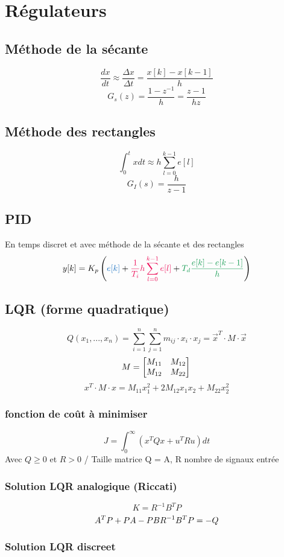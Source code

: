 \documentclass[resume]{subfiles}
\begin{document}
\section{Régulateurs}
\subsection{Méthode de la sécante}
$$\boxed{\frac{dx}{dt}\approx\frac{\Delta x}{\Delta t}=\frac{x[k]-x[k-1]}{h}}$$
$$G_s(z)=\frac{1-z^{-1}}{h}=\frac{z-1}{hz}$$
\subsection{Méthode des rectangles}
$$\boxed{\int_{0}^{t}xdt\approx h\sum_{l=0}^{k-1}e[l]}$$
$$G_{I}(s)=\frac{h}{z-1}$$
\subsection{PID}
En temps discret et avec méthode de la sécante et des rectangles
$$y[k]=K_p\left(\Pcolor{e[k]}+\Icolor{\frac{1}{T_i}h\sum_{l=0}^{k-1}e[l]}+\Dcolor{T_d\frac{e[k]-e[k-1]}{h}}\right)$$

\subsection{LQR (forme quadratique)}
$$Q(x_1,...,x_n) = \sum_{i=1}^{n}\sum_{j=1}^{n}m_{ij}\cdot x_i\cdot x_j = \vec{x}^T\cdot M\cdot \vec{x}$$
$$M = 
\begin{bmatrix}
M_{11} & M_{12}\\
M_{12} & M_{22}
\end{bmatrix}\\$$
$$x^T\cdot M\cdot x = M_{11}x_1^2+2M_{12}x_1x_2+M_{22}x_2^2$$

\subsubsection{fonction de coût à minimiser}
$$J = \int_0^{\infty}(x^TQx + u^TRu)dt$$
Avec $Q\geq0$ et $R > 0$  / Taille matrice Q = A, R nombre de signaux entrée
\subsubsection{Solution LQR analogique (Riccati)}

$$
K = R^{-1}B^TP$$
$$A^TP + PA-PBR^{-1}B^TP = -Q \space\space\space$$

\subsubsection{Solution LQR discreet}
\end{document}
